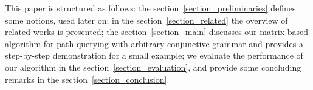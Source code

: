 This paper is structured as follows: the section~\ref{section_preliminaries} defines some notions, used later on; in the section~\ref{section_related} the overview of related works is presented; the section~\ref{section_main} discusses our matrix-based algorithm for path querying with arbitrary conjunctive grammar and provides a step-by-step demonstration for a small example;  we evaluate the performance of our algorithm in the section~\ref{section_evaluation}, and provide some concluding remarks in the section~\ref{section_conclusion}.
